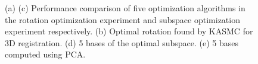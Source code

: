\documentclass{article} %
\begin{document}
\begin{figure}[t]
  \begin{minipage}[b]{0.48\linewidth}
  \end{minipage} 
  \begin{minipage}[b]{0.48\linewidth}
  \end{minipage}
  \caption{(a) (c) Performance comparison of five optimization algorithms in the rotation optimization experiment and subspace optimization experiment respectively. 
  (b) Optimal rotation found by KASMC for 3D registration. (d) 5 bases of the optimal subspace. (e) 5 bases computed using PCA.}
\end{figure}
\end{document}
